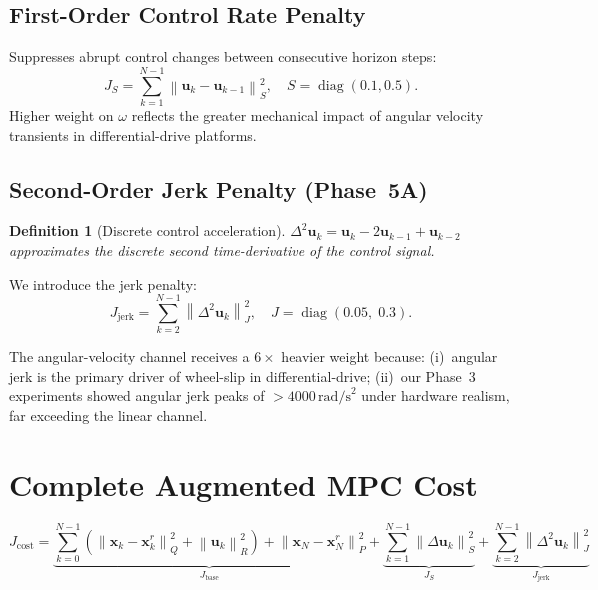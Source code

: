 \documentclass[12pt,a4paper,oneside]{report}
\newtheorem{definition}{Definition}[chapter]
\newcommand{\norm}[1]{\left\lVert#1\right\rVert}
\newcommand{\diag}{\operatorname{diag}}
\begin{document}
\subsection{First-Order Control Rate Penalty}

Suppresses abrupt control changes between consecutive horizon steps:
\begin{equation}
  J_S = \sum_{k=1}^{N-1}\norm{\mathbf{u}_k - \mathbf{u}_{k-1}}_{S}^2,\quad
  S = \diag(0.1, 0.5).
\end{equation}
Higher weight on \(\omega\) reflects the greater mechanical impact of
angular velocity transients in differential-drive platforms.

\subsection{Second-Order Jerk Penalty (Phase~5A)}

\begin{definition}[Discrete control acceleration]
  \(\Delta^2\mathbf{u}_k = \mathbf{u}_k - 2\mathbf{u}_{k-1} + \mathbf{u}_{k-2}\)
  approximates the discrete second time-derivative of the control signal.
\end{definition}

We introduce the jerk penalty:
\begin{equation}\label{eq:jerk_cost}
  J_{\mathrm{jerk}} = \sum_{k=2}^{N-1}\norm{\Delta^2\mathbf{u}_k}_{J}^2,\quad
  J = \diag(0.05,\;0.3).
\end{equation}

The angular-velocity channel receives a \(6\times\) heavier weight because:
(i)~angular jerk is the primary driver of wheel-slip in differential-drive;
(ii)~our Phase~3 experiments showed angular jerk peaks of
\(>4000\,\text{rad/s}^2\) under hardware realism, far exceeding the
linear channel.

\section{Complete Augmented MPC Cost}

\begin{equation}\label{eq:full_cost}
  J_{\mathrm{cost}} =
    \underbrace{\sum_{k=0}^{N-1}\!\left(\norm{\mathbf{x}_k-\mathbf{x}^r_k}_{Q}^2
    +\norm{\mathbf{u}_k}_{R}^2\right)+\norm{\mathbf{x}_N-\mathbf{x}^r_N}_{P}^2
    }_{J_{\mathrm{base}}}
    +\underbrace{\sum_{k=1}^{N-1}\norm{\Delta\mathbf{u}_k}_{S}^2}_{J_S}
    +\underbrace{\sum_{k=2}^{N-1}\norm{\Delta^2\mathbf{u}_k}_{J}^2}_{J_{\mathrm{jerk}}}
\end{equation}
\end{document}
